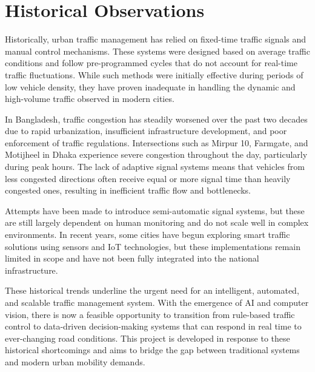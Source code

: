 \section{Historical Observations}
Historically, urban traffic management has relied on fixed-time traffic signals and manual control mechanisms. These systems were designed based on average traffic conditions and follow pre-programmed cycles that do not account for real-time traffic fluctuations. While such methods were initially effective during periods of low vehicle density, they have proven inadequate in handling the dynamic and high-volume traffic observed in modern cities.

In Bangladesh, traffic congestion has steadily worsened over the past two decades due to rapid urbanization, insufficient infrastructure development, and poor enforcement of traffic regulations. Intersections such as Mirpur 10, Farmgate, and Motijheel in Dhaka experience severe congestion throughout the day, particularly during peak hours. The lack of adaptive signal systems means that vehicles from less congested directions often receive equal or more signal time than heavily congested ones, resulting in inefficient traffic flow and bottlenecks.

Attempts have been made to introduce semi-automatic signal systems, but these are still largely dependent on human monitoring and do not scale well in complex environments. In recent years, some cities have begun exploring smart traffic solutions using sensors and IoT technologies, but these implementations remain limited in scope and have not been fully integrated into the national infrastructure.

These historical trends underline the urgent need for an intelligent, automated, and scalable traffic management system. With the emergence of AI and computer vision, there is now a feasible opportunity to transition from rule-based traffic control to data-driven decision-making systems that can respond in real time to ever-changing road conditions. This project is developed in response to these historical shortcomings and aims to bridge the gap between traditional systems and modern urban mobility demands.